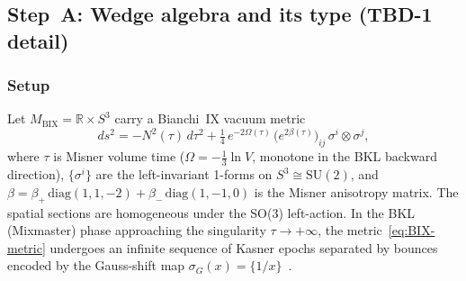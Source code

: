
\subsection{Step~A: Wedge algebra and its type (TBD-1 detail)}
\label{ssec:wedge-detail}

\subsubsection*{Setup}

Let $M_{\mathrm{BIX}} = \mathbb{R}\times S^3$ carry a Bianchi~IX vacuum metric
\begin{equation}
  ds^2 = -N^2(\tau)\,d\tau^2
         + \tfrac{1}{4}\,e^{-2\Omega(\tau)}\,
           \bigl(e^{2\beta(\tau)}\bigr)_{ij}\,\sigma^i\otimes\sigma^j,
  \label{eq:BIX-metric}
\end{equation}
where $\tau$ is Misner volume time ($\Omega = -\frac{1}{3}\ln V$,
monotone in the BKL backward direction),
$\{\sigma^i\}$ are the left-invariant 1-forms on $S^3\cong\mathrm{SU}(2)$,
and $\beta = \beta_+\,\mathrm{diag}(1,1,-2) + \beta_-\,\mathrm{diag}(1,-1,0)$
is the Misner anisotropy matrix.
The spatial sections are homogeneous under the SO(3) left-action.
In the BKL (Mixmaster) phase approaching the singularity
$\tau\to+\infty$, the metric~\eqref{eq:BIX-metric} undergoes an infinite
sequence of Kasner epochs separated by bounces encoded by the
Gauss-shift map $\sigma_G(x)=\{1/x\}$~\cite{ManinMarcolli2015}.

